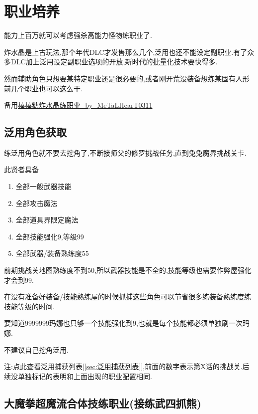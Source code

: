 \newpage

\section{职业培养}

能力上百万就可以考虑强杀高能力怪物练职业了.

炸水晶是上古玩法,那个年代DLC才发售那么几个,泛用也还不能设定副职业.有了众多DLC加上泛用设定副职业选项的开放,新时代的批量化技术要快得多.

然而辅助角色只想要某特定职业还是很必要的,或者刚开荒没装备想练某固有人形前几个职业也可以这么干.

备用\href{http://tieba.baidu.com/p/3717431968}{棒棒糖炸水晶练职业 -by- MeTaLHearT0311}
	
	\subsection{泛用角色获取}

	{\color{red}{修罗以后}}练泛用角色就不要去挖角了,不断接师父的修罗挑战任务,直到兔兔魔界挑战关卡.

	{\color{red}{去兔兔魔界挑战关,抓捕贤者.}}

	此贤者具备
	\begin{enumerate}
		\item 全部一般武器技能
		\item 全部攻击魔法
		\item 全部道具界限定魔法
		\item 全部技能强化9,等级99
		\item 全部武器/装备熟练度55
	\end{enumerate}

	前期挑战关地图熟练度不到50,所以武器技能是不全的,技能等级也需要作弊屋强化才会到99.
	
	在没有准备好装备/技能熟练屋的时候抓捕这些角色可以节省很多练装备熟练度练技能等级的时间.

	要知道9999999玛娜也只够一个技能强化到9,也就是每个技能都必须单独刷一次玛娜.

	不建议自己挖角泛用.

	注:点此查看泛用捕获列表[\ref{sec:泛用捕获列表}],前面的数字表示第X话的挑战关.后续没单独标记的表明和上面出现的职业配置相同.

	\newpage

	\subsection{大魔拳超魔流合体技练职业(接练武四抓熊)}

